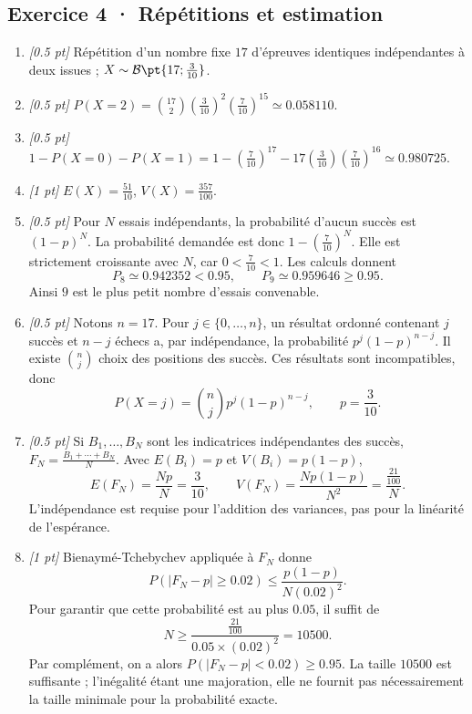 \subsection*{Exercice 4 · Répétitions et estimation}\begin{enumerate}

\item \textit{[\num{0,5} pt]} Répétition d'un nombre fixe $17$ d'épreuves identiques indépendantes à deux issues ; $X\sim\mathcal B\pt{17;\frac{3}{10}}$.

\item \textit{[\num{0,5} pt]} $P(X=2)=\binom{17}2(\frac{3}{10})^2(\frac{7}{10})^{15}\simeq\num{0,058110}$.

\item \textit{[\num{0,5} pt]} $1-P(X=0)-P(X=1)=1-(\frac{7}{10})^{17}-17(\frac{3}{10})(\frac{7}{10})^{16}\simeq\num{0,980725}$.

\item \textit{[1 pt]} $E(X)=\frac{51}{10}$, $V(X)=\frac{357}{100}$.

\item \textit{[\num{0,5} pt]} Pour $N$ essais indépendants, la probabilité d'aucun succès est $(1-p)^N$. La probabilité demandée est donc $1-(\frac{7}{10})^N$. Elle est strictement croissante avec $N$, car $0<\frac{7}{10}<1$. Les calculs donnent
\[P_{8}\simeq\num{0,942352}<\num{0,95},\qquad P_{9}\simeq\num{0,959646}\ge\num{0,95}.\]
Ainsi $9$ est le plus petit nombre d'essais convenable.

\item \textit{[\num{0,5} pt]} Notons $n=17$. Pour $j\in\{0,\ldots,n\}$, un résultat ordonné contenant $j$ succès et $n-j$ échecs a, par indépendance, la probabilité $p^j(1-p)^{n-j}$. Il existe $\binom nj$ choix des positions des succès. Ces résultats sont incompatibles, donc
\[P(X=j)=\binom nj p^j(1-p)^{n-j},\qquad p=\frac{3}{10}.\]

\item \textit{[\num{0,5} pt]} Si $B_1,\ldots,B_N$ sont les indicatrices indépendantes des succès, $F_N=\frac{B_1+\cdots+B_N}{N}$. Avec $E(B_i)=p$ et $V(B_i)=p(1-p)$,
\[E(F_N)=\frac{Np}{N}=\frac{3}{10},\qquad V(F_N)=\frac{Np(1-p)}{N^2}=\frac{\frac{21}{100}}{N}.\]
L'indépendance est requise pour l'addition des variances, pas pour la linéarité de l'espérance.

\item \textit{[1 pt]} Bienaymé-Tchebychev appliquée à $F_N$ donne
\[P(|F_N-p|\ge\num{0,02})\le\frac{p(1-p)}{N(\num{0,02})^2}.\]
Pour garantir que cette probabilité est au plus $\num{0,05}$, il suffit de
\[N\ge\frac{\frac{21}{100}}{\num{0,05}\times(\num{0,02})^2}=10500.\]
Par complément, on a alors $P(|F_N-p|<\num{0,02})\ge\num{0,95}$. La taille $10500$ est suffisante ; l'inégalité étant une majoration, elle ne fournit pas nécessairement la taille minimale pour la probabilité exacte.

\end{enumerate}

